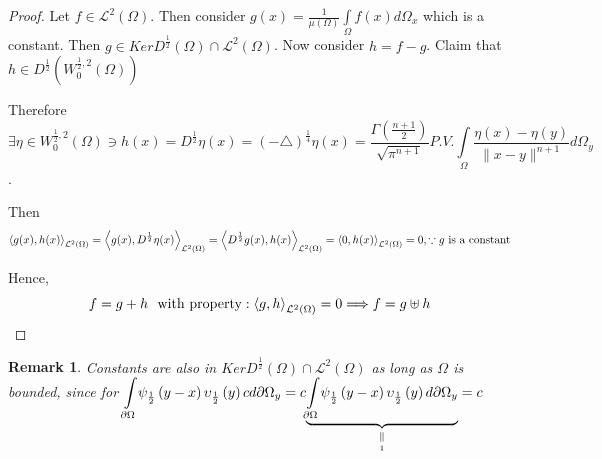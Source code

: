 \documentclass{amsart}%
\theoremstyle{plain}
\newtheorem{remark}{Remark}
\numberwithin{equation}{section}
\begin{document}
\begin{proof}
Let $f\in%
\mathcal{L}%
^{2}\left(  \Omega\right)  $. Then consider $g(x)=\frac{1}{\mu\left(
\Omega\right)  }%
{\displaystyle\int\limits_{\Omega}}
f(x)d\Omega_{x}$ which is a constant. Then $g\in KerD^{\frac{1}{2}}\left(
\Omega\right)  \cap%
\mathcal{L}%
^{2}\left(  \Omega\right)  $. Now consider $h=f-g$. Claim that $h\in
D^{\frac{1}{2}}\left(  W_{0}^{\frac{1}{2},2}\left(  \Omega\right)  \right)  $

Therefore
\[
\exists\eta\in W_{0}^{\frac{1}{2},2}\left(  \Omega\right)  \ni h\left(
x\right)  =D^{\frac{1}{2}}\eta\left(  x\right)  =\left(  -\triangle\right)
^{\frac{1}{4}}\eta\left(  x\right)  =\frac{\Gamma\left(  \frac{n+1}{2}\right)
}{\sqrt{\pi^{n+1}}}P.V.%
{\displaystyle\int\limits_{\Omega}}
\frac{\eta\left(  x\right)  -\eta\left(  y\right)  }{\parallel x-y\parallel
^{n+1}}d\Omega_{y}%
\]
.

Then
\[
\left\langle g(x),h(x)\right\rangle _{%
\mathcal{L}%
^{2}\left(  \Omega\right)  }=\left\langle g(x),D^{\frac{1}{2}}\eta
(x)\right\rangle _{%
\mathcal{L}%
^{2}\left(  \Omega\right)  }=\left\langle D^{\frac{1}{2}}%
g(x),h(x)\right\rangle _{%
\mathcal{L}%
^{2}\left(  \Omega\right)  }=\left\langle 0,h(x)\right\rangle _{%
\mathcal{L}%
^{2}\left(  \Omega\right)  }=0,\because g\text{ is a constant}%
\]


Hence,%
\[
f=g+h\text{ \ with property}:\left\langle g,h\right\rangle _{%
\mathcal{L}%
^{2}\left(  \Omega\right)  }=0\Longrightarrow f=g\uplus h
\]

\end{proof}

\begin{remark}
Constants are also in $KerD^{\frac{1}{2}}\left(  \Omega\right)  \cap%
\mathcal{L}%
^{2}\left(  \Omega\right)  $ as long as $\Omega$ is bounded, since for $%
{\displaystyle\int\limits_{\partial\Omega}}
\psi_{\frac{1}{2}}\left(  y-x\right)  \upsilon_{\frac{1}{2}}\left(  y\right)
cd\partial\Omega_{y}=c\underset{\underset{1}{\parallel}}{\underbrace{%
{\displaystyle\int\limits_{\partial\Omega}}
\psi_{\frac{1}{2}}\left(  y-x\right)  \upsilon_{\frac{1}{2}}\left(  y\right)
d\partial\Omega_{y}}}=c$
\end{remark}
\end{document}

